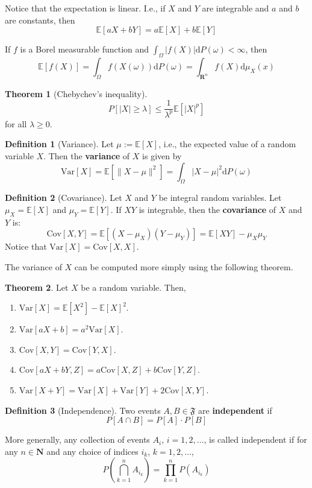 \documentclass[12pt,a4paper]{article}
\theoremstyle{definition}
\newtheorem{theorem}{Theorem}[section]
\newtheorem{definition}{Definition}[section]
\begin{document}
Notice that the expectation is linear. I.e., if $X$ and $Y$ are integrable and $a$ and $b$ are constants, then \[ \mathbb{E} [aX+bY] = a \mathbb{E}[X] + b \mathbb{E}[Y] \]

If $f$ is a Borel measurable function and $\int_{\Omega} |f(X)| \mathrm{d} P(\omega) < \infty$, then
\[
	\mathbb{E}[f(X)] = \int_{\Omega} f(X(\omega)) \mathrm{d} P(\omega) = \int_{\textbf{R}^n} f(X) \mathrm{d}\mu_X(x)
\]

\begin{theorem}[Chebychev's inequality]
	\[
		P[ |X| \geq \lambda] \leq \frac{1}{\lambda^p} \mathbb{E}[|X|^p]
	\]
	for all $\lambda \geq 0$.
\end{theorem}

\begin{definition}[Variance]
	Let $\mu := \mathbb{E}[X]$, i.e., the expected value of a random variable $X$. Then the \textbf{variance} of $X$ is given by
	\[
		\text{Var}[X] = \mathbb{E}[\|X - \mu\|^2] = \int_{\Omega} |X - \mu|^2 \mathrm{d} P(\omega)
	\]
\end{definition}

\begin{definition}[Covariance]
	Let $X$ and $Y$ be integral random variables. Let $\mu_X = \mathbb{E}[X]$ and $\mu_Y = \mathbb{E}[Y]$. If $XY$ is integrable, then the \textbf{covariance} of $X$ and $Y$ is:
	\[
		\text{Cov}[X,Y] = \mathbb{E}[(X-\mu_X)(Y-\mu_Y)] = \mathbb{E}[XY]-\mu_X \mu_Y
	\]
	Notice that $\text{Var}[X] = \text{Cov}[X,X]$.
\end{definition}

The variance of $X$ can be computed more simply using the following theorem.

\begin{theorem}
	Let $X$ be a random variable. Then,
	\begin{enumerate}
		\item $\text{Var}[X] = \mathbb{E}[X^2] - \mathbb{E}[X]^2$.
		\item $\text{Var}[aX+b] = a^2 \text{Var}[X]$.
		\item $\text{Cov}[X,Y] = \text{Cov}[Y,X]$.
		\item $\text{Cov}[aX+bY,Z] = a \text{Cov}[X,Z] + b \text{Cov}[Y,Z]$.
		\item $\text{Var}[X+Y] = \text{Var}[X] + \text{Var}[Y] + 2 \text{Cov}[X,Y]$.
	\end{enumerate}		
\end{theorem}

\begin{definition}[Independence]
	Two events $A, B \in \mathfrak{F}$ are \textbf{independent} if
	\[
		P[A \cap B] = P[A]\cdot P[B]
	\]
	
	More generally, any collection of events $A_i$, $i = 1,2,\ldots$, is called independent if for any $n \in \textbf{N}$ and any choice of indices $i_k$, $k = 1, 2, \ldots$, 
	\[
		P \left( \bigcap_{k=1}^n A_{i_k} \right) = \prod_{k=1}^n P\left( A_{i_k} \right)
	\]
\end{definition}
\end{document}
